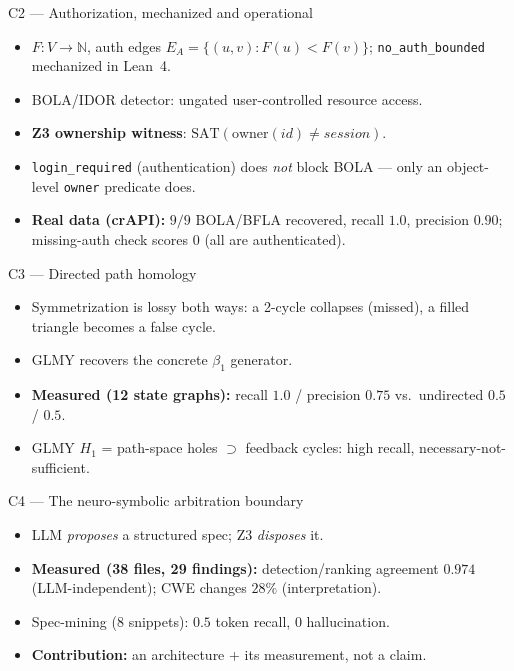 \documentclass[aspectratio=169,11pt]{beamer}
\newcommand{\N}{\mathbb{N}}
\begin{document}
\begin{frame}{C2 --- Authorization, mechanized and operational}
  \begin{itemize}
    \item $F:V\to\N$, auth edges $E_A=\{(u,v):F(u)<F(v)\}$; \texttt{no\_auth\_bounded}
          mechanized in Lean~4.
    \item BOLA/IDOR detector: ungated user-controlled resource access.
    \item \textbf{Z3 ownership witness}: $\mathrm{SAT}(\mathrm{owner}(id)\neq session)$.
    \item \texttt{login\_required} (authentication) does \emph{not} block BOLA ---
          only an object-level \texttt{owner} predicate does.
    \item \textbf{Real data (crAPI):} $9/9$ BOLA/BFLA recovered, recall $1.0$,
          precision $0.90$; missing-auth check scores $0$ (all are authenticated).
  \end{itemize}
\end{frame}

\begin{frame}{C3 --- Directed path homology}
  \begin{itemize}
    \item Symmetrization is lossy both ways: a 2-cycle collapses (missed), a
          filled triangle becomes a false cycle.
    \item GLMY recovers the concrete $\beta_1$ generator.
    \item \textbf{Measured (12 state graphs):} recall $1.0$ / precision $0.75$
          vs.\ undirected $0.5$ / $0.5$.
    \item GLMY $H_1$ = path-space holes $\supset$ feedback cycles: high recall,
          necessary-not-sufficient.
  \end{itemize}
\end{frame}

\begin{frame}{C4 --- The neuro-symbolic arbitration boundary}
  \begin{itemize}
    \item LLM \emph{proposes} a structured spec; Z3 \emph{disposes} it.
    \item \textbf{Measured (38 files, 29 findings):} detection/ranking agreement
          $0.974$ (LLM-independent); CWE changes $28\%$ (interpretation).
    \item Spec-mining (8 snippets): $0.5$ token recall, $0$ hallucination.
    \item \textbf{Contribution:} an architecture + its measurement, not a claim.
  \end{itemize}
\end{frame}
\end{document}
